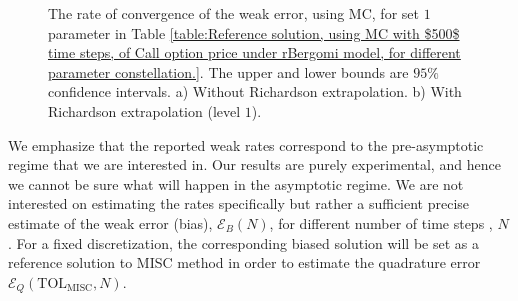 \begin{figure}[h!]
	\caption{The rate of convergence of the weak error, using MC, for set $1$ parameter in Table \ref{table:Reference solution, using MC with $500$ time steps, of Call option price under rBergomi model, for different parameter constellation.}. The upper and lower bounds are $95\%$ confidence intervals. a) Without Richardson extrapolation.  b) With Richardson extrapolation (level $1$).}
	\label{fig:Weak_rate_set1_set_2_without_rich}
\end{figure}
\FloatBarrier




\begin{remark}
We emphasize that the reported weak rates correspond to the pre-asymptotic regime that we are interested in. Our results are purely experimental, and hence we cannot be sure what will happen in the asymptotic regime. We are not interested on estimating the rates specifically but rather a sufficient precise estimate of the weak error (bias), $\mathcal{E}_B(N)$, for different  number of time steps , $N$.  For a fixed discretization, the corresponding biased solution will be set as a reference solution to  MISC method  in order to estimate the quadrature error $\mathcal{E}_Q(\text{TOL}_{\text{MISC}},N)$.	
\end{remark}

%
%	

